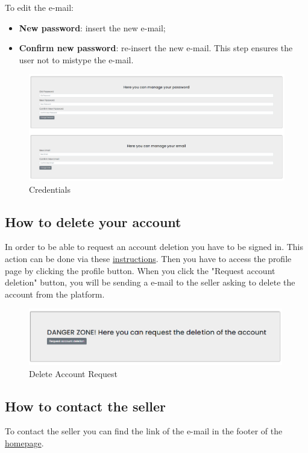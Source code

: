 To edit the e-mail:
\begin{itemize} 
    \item \textbf{New password}: insert the new e-mail; 
    \item \textbf{Confirm new password}: re-insert the new e-mail. This step ensures the user not to  mistype the e-mail.
\end{itemize}

\begin{figure}[H]
    \centering
    \includegraphics[width=\linewidth]{res/images/cliente/credentials.png}
    \caption{Credentials}
\end{figure}
\subsection{How to delete your account} \label{_delete}
In order to be able to request an account deletion you have to be signed in. This action can be done via these \hyperref[_signin]{instructions}.
Then you have to access the profile page by clicking the profile button.
When you click the "Request account deletion" button, you will be sending a e-mail to the seller asking to delete the account from the platform.
\begin{figure}[H]
    \centering
    \includegraphics[width=30em]{res/images/cliente/delete.png}
    \caption{Delete Account Request}
\end{figure}

\subsection{How to contact the seller} \label{_contacts}
To contact the seller you can find the link of the e-mail in the footer of the \hyperref[_homepage]{homepage}.


